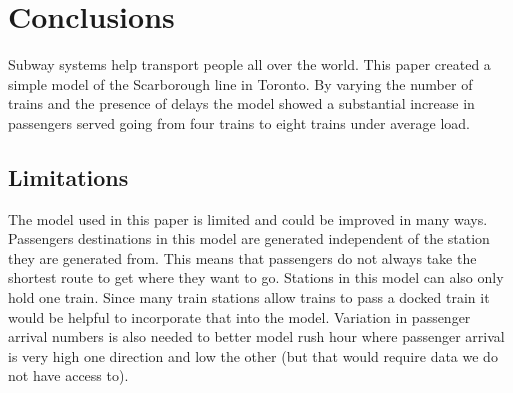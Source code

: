 \section{Conclusions}

Subway systems help transport people all over the world. This paper created a
simple model of the Scarborough line in Toronto. By varying the number of trains
and the presence of delays the model showed a substantial increase in passengers
served going from four trains to eight trains under average load. 

\subsection{Limitations}

The model used in this paper is limited and could be improved in many ways. Passengers
destinations in this model are generated independent of the station they are generated
from. This means that passengers do not always take the shortest route to get where
they want to go. Stations in this model can also only hold one train. Since many train
stations allow trains to pass a docked train it would be helpful to incorporate that
into the model. Variation in passenger arrival numbers is also needed to better model
rush hour where passenger arrival is very high one direction and low the other (but 
that would require data we do not have access to).